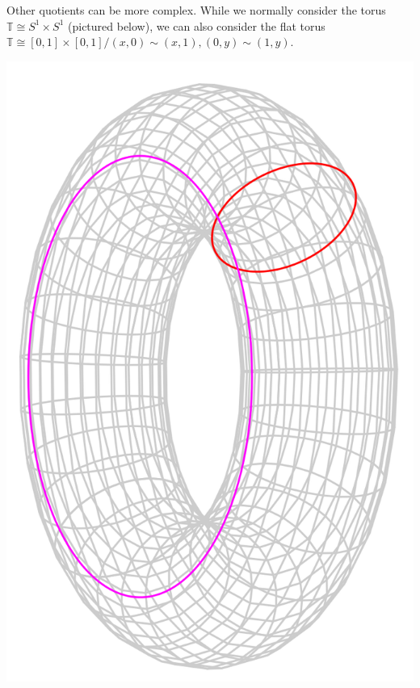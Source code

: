 \documentclass[tikz]{beamer}
\theoremstyle{definition}
\begin{document}
\frame
{
	Other quotients can be more complex. While we normally consider the torus $\mathbb{T} \cong S^1 \times S^1$ (pictured below), we can also consider the flat torus $\mathbb{T}  \cong [0,1] \times [0,1] / (x,0) \sim (x,1), (0, y) \sim (1, y)$.
	
	\begin{center}
		\includegraphics[scale=0.1]{torus_skeleton}
	\end{center}
	 
}
\end{document}
